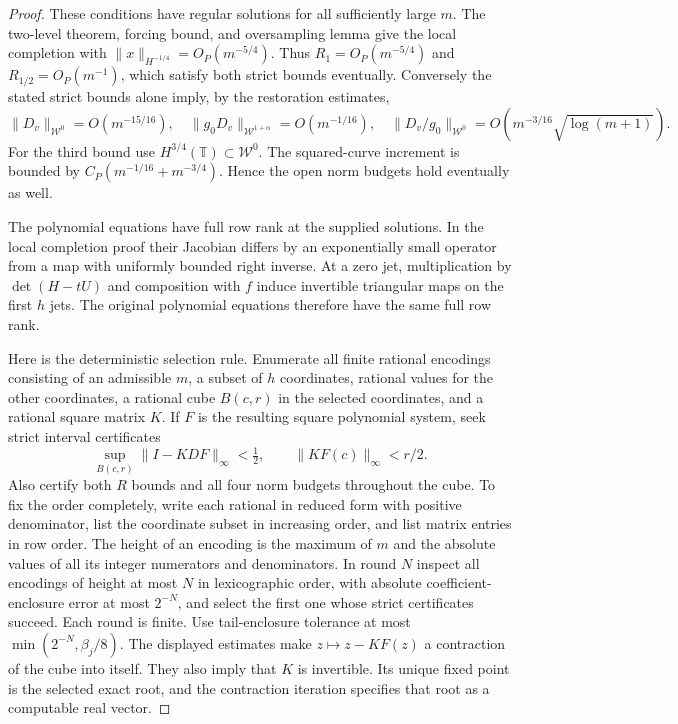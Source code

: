 \documentclass[11pt]{article}
\newcommand{\T}{\mathbb T}
\begin{document}
\begin{proof}
These conditions have regular solutions for all sufficiently
large $m$. The two-level theorem, forcing bound, and oversampling
lemma give the local completion with
$\|x\|_{H^{-1/4}}=O_P(m^{-5/4})$.
Thus $R_1=O_P(m^{-5/4})$ and $R_{1/2}=O_P(m^{-1})$, which
satisfy both strict bounds eventually. Conversely the stated
strict bounds alone imply, by the restoration estimates,
\[
 \|D_v\|_{\mathcal W^0}=O(m^{-15/16}),\quad
 \|g_0D_v\|_{\mathcal W^{1+\alpha}}=O(m^{-1/16}),\quad
 \|D_v/g_0\|_{\mathcal W^0}
       =O(m^{-3/16}\sqrt{\log(m+1)}).
\]
For the third bound use $H^{3/4}(\T)\subset\mathcal W^0$.
The squared-curve increment is bounded by
$C_P(m^{-1/16}+m^{-3/4})$. Hence the open norm budgets hold
eventually as well.

The polynomial equations have full row rank at the supplied
solutions. In the local completion proof their Jacobian differs
by an exponentially small operator from a map with uniformly
bounded right inverse. At a zero jet, multiplication by
$\det(H-tU)$ and composition with $f$ induce invertible
triangular maps on the first $h$ jets. The original polynomial
equations therefore have the same full row rank.

Here is the deterministic selection rule. Enumerate all finite
rational encodings consisting of an admissible
$m$, a subset of $h$ coordinates, rational values for the other
coordinates, a rational cube $B(c,r)$ in the selected coordinates,
and a rational square matrix $K$. If $F$ is the resulting square
polynomial system, seek strict interval certificates
\[
 \sup_{B(c,r)}\|I-KDF\|_\infty<\tfrac12,\qquad
 \|KF(c)\|_\infty<r/2.
\]
Also certify both $R$ bounds and all four norm budgets throughout
the cube. To fix the order completely, write each rational in
reduced form with positive denominator, list the coordinate subset
in increasing order, and list matrix entries in row order. The height
of an encoding is the maximum of $m$ and the absolute values of all
its integer numerators and denominators. In round $N$ inspect all
encodings of height at most $N$ in lexicographic order, with absolute
coefficient-enclosure error at most $2^{-N}$, and select the first
one whose strict certificates succeed. Each round is finite.
Use tail-enclosure tolerance at most $\min(2^{-N},\beta_j/8)$.
The displayed estimates make $z\mapsto z-KF(z)$ a contraction
of the cube into itself. They also imply that $K$ is invertible.
Its unique fixed point is the selected exact root, and the
contraction iteration specifies that root as a computable real vector.


\end{proof}
\end{document}
